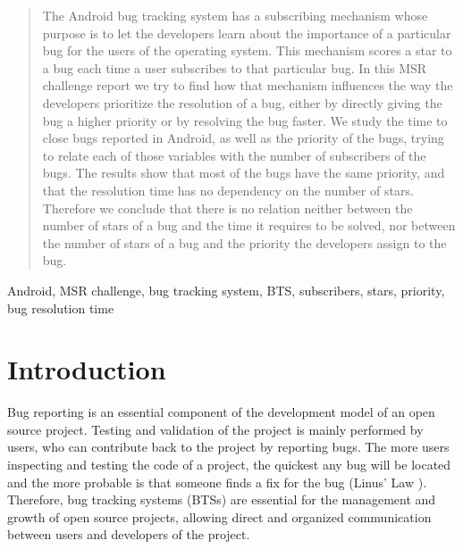 \documentclass[10pt, conference, compsocconf]{IEEEtran}
\begin{document}
\begin{abstract}
The Android bug tracking system has a subscribing mechanism whose purpose is to let the developers learn about the importance of a particular bug for the users of the operating system. This mechanism scores a star to a bug each time a user subscribes to that particular bug. In this MSR challenge report we try to find how that mechanism influences the way the developers prioritize the resolution of a bug, either by directly giving the bug a higher priority or by resolving the bug faster. We study the time to close bugs reported in Android, as well as the priority of the bugs, trying to relate each of those variables with the number of subscribers of the bugs. The results show that most of the bugs have the same priority, and that the resolution time has no dependency on the number of stars. Therefore we conclude that there is no relation neither between the number of stars of a bug and the time it requires to be solved, nor between the number of stars of a bug and the priority the developers assign to the bug.
\end{abstract}

\begin{IEEEkeywords}
Android, MSR challenge, bug tracking system, BTS, subscribers, stars, priority, bug resolution time
\end{IEEEkeywords}


%
\IEEEpeerreviewmaketitle



\section{Introduction}
Bug reporting is an essential component of the development model of an open source project. Testing and validation of the project is mainly performed by users, who can contribute back to the project by reporting bugs. The more users inspecting and testing the code of a project, the quickest any bug will be located and the more probable is that someone finds a fix for the bug (Linus' Law \cite{CathedralBazaar}). Therefore, bug tracking systems (BTSs) are essential for the management and growth of open source projects, allowing direct and organized communication between users and developers of the project.
\end{document}
